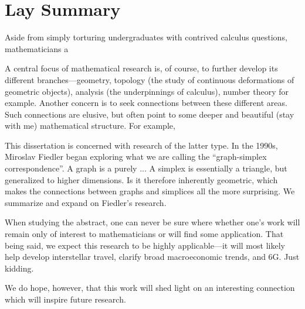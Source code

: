 \chapter*{Lay Summary}

Aside from simply torturing undergraduates with contrived calculus questions, mathematicians a

A central focus of mathematical  research is, of course, to further develop its different branches---geometry, topology (the study of continuous deformations of geometric objects), analysis (the underpinnings of calculus), number theory for example. Another concern  is to seek connections between these different areas. Such  connections are elusive, but often point to some deeper and beautiful (stay with me) mathematical structure. For example, 

This dissertation is concerned with research of the latter type. In  the 1990s, Miroslav Fiedler began exploring what we are calling the ``graph-simplex correspondence''. A graph is a purely ...
A simplex is essentially a triangle, but generalized  to higher dimensions. Is it therefore inherently geometric, which makes the connections between graphs and simplices all the more surprising. We summarize and expand on Fiedler's research. 

When studying the abstract, one can never be  sure where whether one's work will remain only of interest to mathematicians or will find some application. That being said, we expect this research to be highly applicable---it will most likely help develop interstellar travel, clarify broad macroeconomic trends, and 6G. Just kidding. 

We do hope, however, that this work will shed light on an interesting connection which will inspire future research. 
 

